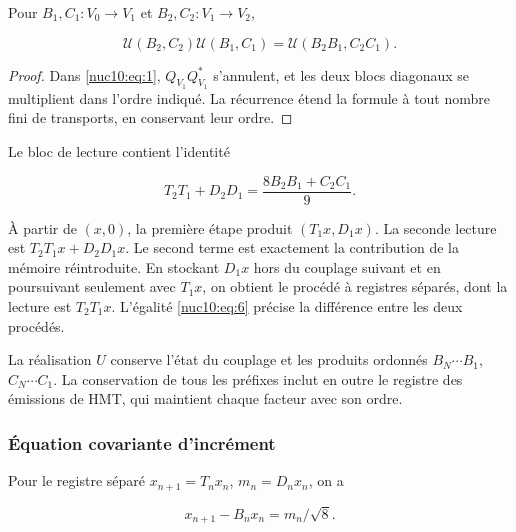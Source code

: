 Pour \(B_1,C_1:V_0\to V_1\) et \(B_2,C_2:V_1\to V_2\),



\begin{equation}
\boxed{\mathcal U(B_2,C_2)\mathcal U(B_1,C_1)
=\mathcal U(B_2B_1,C_2C_1).}
\label{nuc10:eq:5}
\end{equation}



\begin{proof}
Dans \eqref{nuc10:eq:1}, \(Q_{V_1}Q_{V_1}^*\) s’annulent, et les deux blocs diagonaux se multiplient dans l’ordre indiqué. La récurrence étend la formule à tout nombre fini de transports, en conservant leur ordre.

\end{proof}

Le bloc de lecture contient l’identité



\begin{equation}
\boxed{T_2T_1+D_2D_1=\frac{8B_2B_1+C_2C_1}{9}.}
\label{nuc10:eq:6}
\end{equation}



À partir de \((x,0)\), la première étape produit \((T_1x,D_1x)\). La seconde lecture est \(T_2T_1x+D_2D_1x\). Le second terme est exactement la contribution de la mémoire réintroduite. En stockant \(D_1x\) hors du couplage suivant et en poursuivant seulement avec \(T_1x\), on obtient le procédé à registres séparés, dont la lecture est \(T_2T_1x\). L’égalité \eqref{nuc10:eq:6} précise la différence entre les deux procédés.

La réalisation \(U\) conserve l’état du couplage et les produits ordonnés \(B_N\cdots B_1\), \(C_N\cdots C_1\). La conservation de tous les préfixes inclut en outre le registre des émissions de HMT, qui maintient chaque facteur avec son ordre.

\subsubsection{Équation covariante d’incrément
}

Pour le registre séparé \(x_{n+1}=T_nx_n\), \(m_n=D_nx_n\), on a




\begin{equation}
x_{n+1}-B_nx_n=m_n/\sqrt8.
\label{nuc10:eq:7}
\end{equation}



